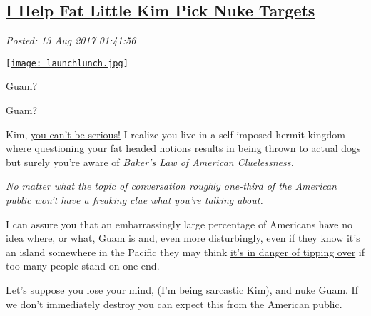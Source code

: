 %

\subsection*{\href{https://analyzethedatanotthedrivel.org/2017/08/12/i-help-fat-little-kim-pick-nuke-targets/}{I Help Fat Little Kim Pick Nuke Targets}}


\noindent\emph{Posted: 13 Aug 2017 01:41:56}
\vspace{6pt}


 \captionsetup[floatingfigure]{labelformat=empty}
 \begin{floatingfigure}[r]{0.25\textwidth}
 \centering
 \href{http://picphotos.net/kim-jong-un-fat-meme/}{\texttt{[image: launchlunch.jpg]}}
 \label{fig:5395x0}
 \end{floatingfigure}

Guam?

Guam?

Kim, \href{https://www.youtube.com/watch?v=t0hK1wyrrAU}{you can't be serious!} I realize you live in a self-imposed hermit
kingdom where questioning your fat headed notions results in
\href{http://www.nydailynews.com/news/world/kim-jong-executed-uncle-feeding-pack-starving-dogs-article-1.1565299}{being
thrown to actual dogs} but surely you're aware of \emph{Baker's Law of
American Cluelessness.}

\medskip

\emph{No matter what the topic of conversation roughly one-third of the
American public won't have a freaking clue what you're talking about.}

\medskip

I can assure you that an embarrassingly large percentage of Americans
have no idea where, or what, Guam is and, even more disturbingly,
even if they know it's an island somewhere in the Pacific they may
think \href{http://www.snopes.com/politics/quotes/guamtip.asp}{it's in
danger of tipping over} if too many people stand on one end.

Let's suppose you lose your mind, (I'm being sarcastic Kim), and nuke
Guam. If we don't immediately destroy you can expect this from the
American public.

